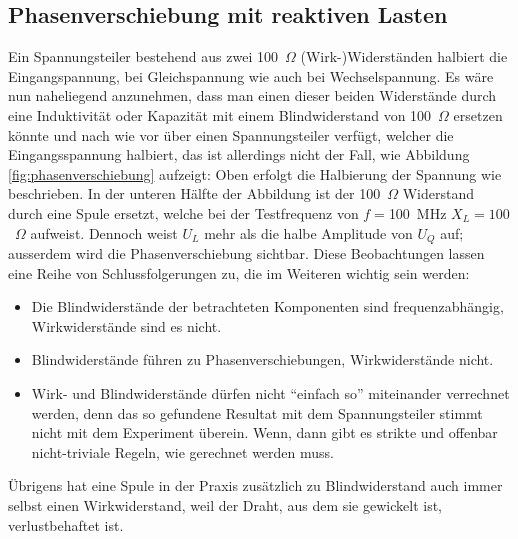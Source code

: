 \documentclass[twoside,a4paper,11pt,halfparskip,DIV=11,notitlepage]{scrartcl}
\begin{document}
\subsection{Phasenverschiebung mit reaktiven Lasten}
Ein Spannungsteiler bestehend aus zwei 100~$\Omega$ (Wirk-)Widerständen halbiert die Eingangspannung,
bei Gleichspannung wie auch bei Wechselspannung. %
Es wäre nun naheliegend anzunehmen, dass man einen dieser beiden Widerstände
durch eine Induktivität oder Kapazität mit einem Blindwiderstand von 100~$\Omega$
ersetzen könnte und nach wie vor über einen Spannungsteiler verfügt, welcher
die Eingangsspannung halbiert, das ist allerdings nicht der Fall, wie Abbildung
\ref{fig:phasenverschiebung} aufzeigt: Oben erfolgt die Halbierung der Spannung
wie beschrieben. In der unteren Hälfte der Abbildung ist der 100~$\Omega$
Widerstand durch eine Spule ersetzt, welche bei der Testfrequenz von $f=$100~MHz
$X_L=100$~$\Omega$ aufweist. Dennoch weist $U_L$ mehr als die halbe Amplitude von
$U_Q$ auf; ausserdem wird die Phasenverschiebung sichtbar. Diese Beobachtungen
lassen eine Reihe von Schlussfolgerungen zu, die im Weiteren wichtig sein werden:

\begin{itemize}
    \item Die Blindwiderstände der betrachteten Komponenten sind frequenzabhängig,
        Wirkwiderstände sind es nicht.
    \item Blindwiderstände führen zu Phasenverschiebungen, Wirkwiderstände nicht.
    \item Wirk- und Blindwiderstände dürfen nicht ``einfach so'' miteinander
        verrechnet werden, denn das so gefundene Resultat mit dem Spannungsteiler 
        stimmt nicht mit dem Experiment überein. Wenn, dann gibt es strikte und
        offenbar nicht-triviale Regeln, wie gerechnet werden muss.
\end{itemize}

Übrigens hat eine Spule in der Praxis zusätzlich zu Blindwiderstand auch immer
selbst einen Wirkwiderstand, weil der Draht, aus dem sie gewickelt ist,
verlustbehaftet ist. 
\end{document}
